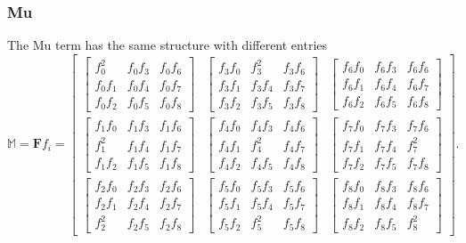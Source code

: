 \subsubsection{Mu}
The Mu term has the same structure with different entries
\[
\mathbb{M} = \mathbf{F} f_i = \left[\begin{array}{ccc}{\begin{bmatrix} f_0^2 & f_0f_3 & f_0f_6 \\ f_0f_1 & f_0f_4 & f_0f_7 \\ f_0f_2 & f_0f_5 & f_0f_8 \end{bmatrix}} & {\begin{bmatrix} f_3f_0 & f_3^2 & f_3f_6 \\ f_3f_1 & f_3f_4 & f_3f_7 \\ f_3f_2 & f_3f_5 & f_3f_8 \end{bmatrix}} & {\begin{bmatrix} f_6f_0 & f_6f_3 & f_6f_6 \\ f_6f_1 & f_6f_4 & f_6f_7 \\ f_6f_2 & f_6f_5 & f_6f_8 \end{bmatrix}} \\ {\begin{bmatrix} f_1f_0 & f_1f_3 & f_1f_6 \\ f_1^2 & f_1f_4 & f_1f_7 \\ f_1f_2 & f_1f_5 & f_1f_8 \end{bmatrix}} & {\begin{bmatrix} f_4f_0 & f_4f_3 & f_4f_6 \\ f_4f_1 & f_4^2 & f_4f_7 \\ f_4f_2 & f_4f_5 & f_4f_8 \end{bmatrix}} & {\begin{bmatrix} f_7f_0 & f_7f_3 & f_7f_6 \\ f_7f_1 & f_7f_4 & f_7^2 \\ f_7f_2 & f_7f_5 & f_7f_8 \end{bmatrix}} \\ {\begin{bmatrix} f_2f_0 & f_2f_3 & f_2f_6 \\ f_2f_1 & f_2f_4 & f_2f_7 \\ f_2^2 & f_2f_5 & f_2f_8 \end{bmatrix}} & {\begin{bmatrix} f_5f_0 & f_5f_3 & f_5f_6 \\ f_5f_1 & f_5f_4 & f_5f_7 \\ f_5f_2 & f_5^2 & f_5f_8 \end{bmatrix}} & {\begin{bmatrix} f_8f_0 & f_8f_3 & f_8f_6 \\ f_8f_1 & f_8f_4 & f_8f_7 \\ f_8f_2 & f_8f_5 & f_8^2 \end{bmatrix}} \end{array}\right].
\]
